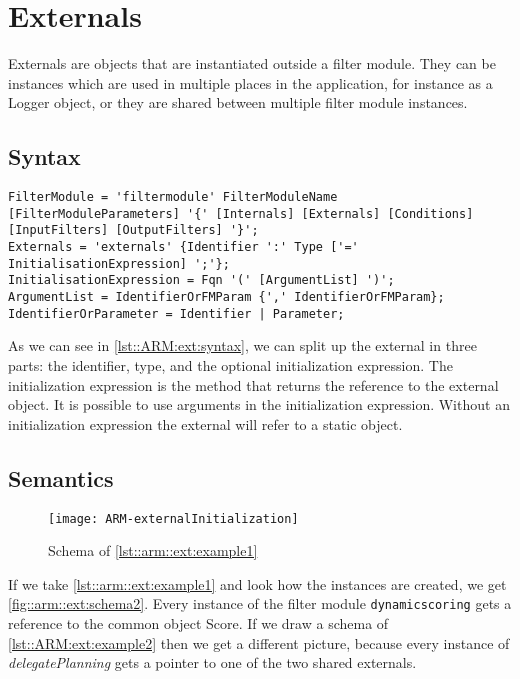 \chapter{Externals}
Externals are objects that are instantiated outside a filter module.
They can be instances which are used in multiple places in the application, for instance as a Logger object, or they are shared between multiple filter module instances.

\section{Syntax}
\begin{lstlisting}[caption = {Externals syntax}, label = lst::ARM:ext:syntax,
style = listing, language = ebnf, float = tpb]
FilterModule = 'filtermodule' FilterModuleName [FilterModuleParameters] '{' [Internals] [Externals] [Conditions] [InputFilters] [OutputFilters] '}';
Externals = 'externals' {Identifier ':' Type ['=' InitialisationExpression] ';'};
InitialisationExpression = Fqn '(' [ArgumentList] ')';
ArgumentList = IdentifierOrFMParam {',' IdentifierOrFMParam};
IdentifierOrParameter = Identifier | Parameter;
\end{lstlisting}
As we can see in \autoref{lst::ARM:ext:syntax}, we can split up the external in three parts: the identifier, type, and the optional initialization expression.
The initialization expression is the method that returns the reference to the external object.
It is possible to use arguments in the initialization expression.
Without an initialization expression the external will refer to a static object.

\section{Semantics}
\begin{figure}[tpb]
	\centering
	\texttt{[image: ARM-externalInitialization]}
	\caption{Schema of \autoref{lst::arm::ext:example1}}
	\label{fig::arm::ext:schema2}
\end{figure}
If we take \autoref{lst::arm::ext:example1} and look how the instances are created, we get \autoref{fig::arm::ext:schema2}.
Every instance of the filter module \lstinline!dynamicscoring! gets a reference to the common object Score.
If we draw a schema of \autoref{lst::ARM:ext:example2} then we get a different picture, because every instance of \emph{delegatePlanning} gets a pointer to one of the two shared externals.

